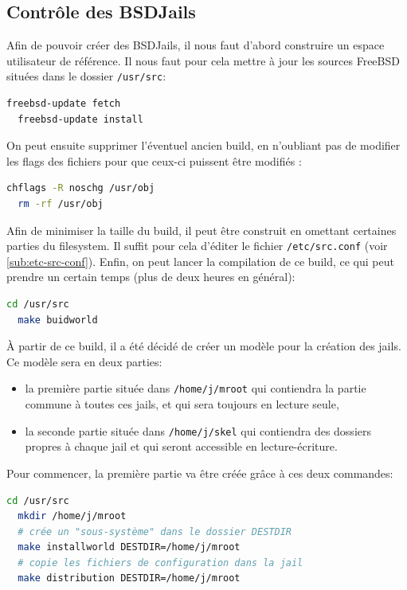 \documentclass[10pt,a4paper]{article}
\begin{document}
\subsection{Contrôle des BSDJails}
\label{subs:Contrôle des BSDJails}
Afin de pouvoir créer des BSDJails, il nous faut d'abord construire un espace utilisateur de référence.
Il nous faut pour cela mettre à jour les sources FreeBSD situées dans le dossier \texttt{/usr/src}:
\begin{lstlisting}[language=bash]
  freebsd-update fetch
  freebsd-update install
\end{lstlisting}

On peut ensuite supprimer l'éventuel ancien build, en n'oubliant pas de modifier les flags des fichiers pour que ceux-ci puissent être modifiés :
\begin{lstlisting}[language=bash]
  chflags -R noschg /usr/obj
  rm -rf /usr/obj
\end{lstlisting}

Afin de minimiser la taille du build, il peut être construit en omettant certaines parties du filesystem. Il suffit pour cela d'éditer le fichier \texttt{/etc/src.conf} (voir \ref{sub:etc-src-conf}).
Enfin, on peut lancer la compilation de ce build, ce qui peut prendre un certain temps (plus de deux heures en général):
\begin{lstlisting}[language=bash]
  cd /usr/src
  make buidworld
\end{lstlisting}

À partir de ce build, il a été décidé de créer un modèle pour la création des jails.
Ce modèle sera en deux parties:
\begin{itemize}
  \item la première partie située dans \texttt{/home/j/mroot} qui contiendra la partie commune à toutes ces jails, et qui sera toujours en lecture seule,
  \item la seconde partie située dans \texttt{/home/j/skel} qui contiendra des dossiers propres à chaque jail et qui seront accessible en lecture-écriture.
\end{itemize}

Pour commencer, la première partie va être créée grâce à ces deux commandes:
\begin{lstlisting}[language=bash]
  cd /usr/src
  mkdir /home/j/mroot
  # crée un "sous-système" dans le dossier DESTDIR
  make installworld DESTDIR=/home/j/mroot
  # copie les fichiers de configuration dans la jail
  make distribution DESTDIR=/home/j/mroot
\end{lstlisting}
\end{document}
